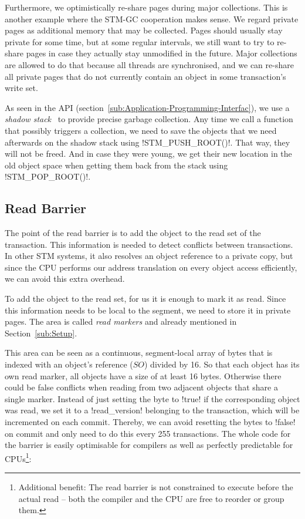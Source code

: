 \documentclass{sigplanconf}
\makeatletter
\renewcommand\lstinline[1][]{%
  \Collectverb{\@@myverb}%
}
\def\@@myverb#1{%
    \begingroup
    \fboxsep=0.2em
    \colorbox{verylightgray}{\oldlstinline|#1|}%
    \endgroup
}
\makeatother
\begin{document}
Furthermore, we optimistically re-share pages during major collections.
This is another example where the STM-GC cooperation makes sense. We
regard private pages as additional memory that may be collected.
Pages should usually stay private for some time, but at some regular
intervals, we still want to try to re-share pages in case they actually
stay unmodified in the future. Major collections are allowed to do
that because all threads are synchronised, and we can re-share all
private pages that do not currently contain an object in some
transaction's  write set.

As seen in the API (section~\ref{sub:Application-Programming-Interfac}),
we use a \emph{shadow stack}~\cite{fergus02} to provide precise garbage
collection.  Any time we call a function that possibly triggers a
collection, we need to save the objects that we need afterwards on the
shadow stack using \lstinline!STM_PUSH_ROOT()!.  That way, they will
not be freed. And in case they were young, we get their new location
in the old object space when getting them back from the stack using
\lstinline!STM_POP_ROOT()!.




\subsection{Read Barrier}

The point of the read barrier is to add the object to the read set of
the transaction. This information is needed to detect conflicts
between transactions. In other STM systems, it also resolves an object reference to
a private copy, but since the CPU performs our address translation on
every object access efficiently, we can avoid this extra overhead.

To add the object to the read set, for us it is enough to mark it as
read. Since this information needs to be local to the segment, we need
to store it in private pages. The area is called \emph{read markers}
and already mentioned in Section~\ref{sub:Setup}.

This area can be seen as a continuous, segment-local array of bytes
that is indexed with an object's reference ($SO$) divided by 16. So
that each object has its own read marker, all objects have a size of
at least 16 bytes. Otherwise there could be false conflicts when
reading from two adjacent objects that share a single marker.
Instead of just setting the byte to \lstinline!true!  if the
corresponding object was read, we set it to a \lstinline!read_version!
belonging to the transaction, which will be incremented on each
commit.  Thereby, we can avoid resetting the bytes to
\lstinline!false!  on commit and only need to do this every 255
transactions. The whole code for the barrier is easily optimisable for
compilers as well as perfectly predictable for
CPUs\footnote{Additional benefit: The read barrier is not constrained
to execute before the actual read -- both the compiler and the CPU are
free to reorder or group them.}:
\end{document}
